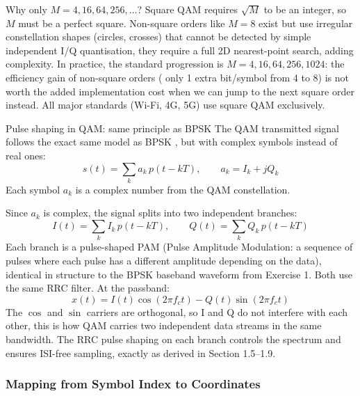 \begin{IntuitionBox}{Why only $M = 4, 16, 64, 256, \ldots$?}
Square QAM requires $\sqrt{M}$ to be an integer, so $M$ must be a perfect square. Non-square orders like $M = 8$ exist but use irregular constellation shapes (circles, crosses) that cannot be detected by simple independent I/Q quantisation, they require a full 2D nearest-point search, adding complexity. In practice, the standard progression is $M = 4, 16, 64, 256, 1024$: the efficiency gain of non-square orders ( only 1 extra bit/symbol from 4 to 8) is not worth the added implementation cost when we can jump to the next square order instead. All major standards (Wi-Fi, 4G, 5G) use square QAM exclusively.
\end{IntuitionBox}

\begin{IntuitionBox}{Pulse shaping in QAM: same principle as BPSK}
The QAM transmitted signal follows the exact same model as BPSK , but with complex symbols instead of real ones:
\begin{equation}
s(t) = \sum_k a_k\,p(t - kT), \qquad a_k = I_k + jQ_k
\end{equation}
Each symbol $a_k$ is a complex number from the QAM constellation.

Since $a_k$ is complex, the signal splits into two independent branches:
\begin{equation}
I(t) = \sum_k I_k\,p(t - kT), \qquad Q(t) = \sum_k Q_k\,p(t - kT)
\end{equation}
Each branch is a pulse-shaped PAM (Pulse Amplitude Modulation: a sequence of pulses where each pulse has a different amplitude depending on the data), identical in structure to the BPSK baseband waveform from Exercise 1. Both use the same RRC filter. At the passband:
\begin{equation}
x(t) = I(t)\cos(2\pi f_c t) - Q(t)\sin(2\pi f_c t)
\end{equation}
The $\cos$ and $\sin$ carriers are orthogonal, so I and Q do not interfere with each other, this is how QAM carries two independent data streams in the same bandwidth. The RRC pulse shaping on each branch controls the spectrum and ensures ISI-free sampling, exactly as derived in Section 1.5--1.9.
\end{IntuitionBox}

\subsubsection{Mapping from Symbol Index to Coordinates}

